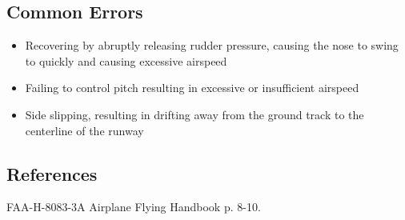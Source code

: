 \subsection{Common Errors}

\begin{itemize}
  \item Recovering by abruptly releasing rudder pressure, causing the nose to
    swing to quickly and causing excessive airspeed
  \item Failing to control pitch resulting in excessive or insufficient airspeed
  \item Side slipping, resulting in drifting away from the ground track to the
    centerline of the runway
\end{itemize}

\subsection{References}

FAA-H-8083-3A Airplane Flying Handbook p. 8-10.

